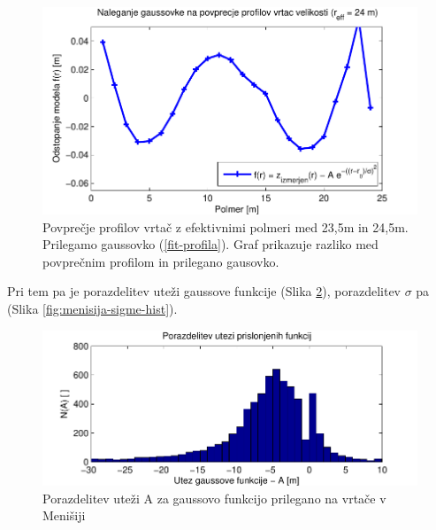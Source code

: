 \documentclass[a4paper, oneside, 12pt]{book}
\begin{document}
        \begin{figure}[H]
          \centering
          \includegraphics{slike/menisija-profil-21-fit}
          \caption{Povprečje profilov vrtač z efektivnimi polmeri med 23,5m in 24,5m. Prilegamo gaussovko (\ref{fit-profila}). Graf prikazuje razliko med povprečnim profilom in prilegano gausovko.}
          \label{fig:menisija-profil-21-fit}
        \end{figure}

        Pri tem pa je porazdelitev uteži gaussove funkcije (Slika \ref{fig:menisija-globine-hist}), porazdelitev $\sigma$ pa (Slika \ref{fig:menisija-sigme-hist}).

        \begin{figure}[H]
          \begin{center}
            \includegraphics{slike/menisija-globine-hist}
          \end{center}
          \caption{Porazdelitev uteži A za gaussovo funkcijo prilegano na vrtače v Menišiji}
          \label{fig:menisija-globine-hist}
        \end{figure}
\end{document}
